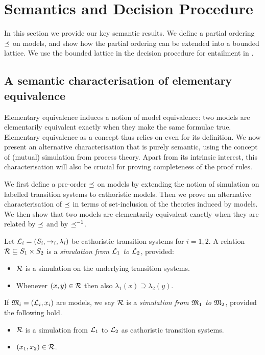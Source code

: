 \section{Semantics and Decision Procedure}\label{elAndBangCore}

In this section we provide our key semantic results.  We define a
partial ordering $\preceq$ on models, and show how the partial
ordering can be extended into a bounded lattice.  We use the bounded
lattice in the  decision procedure for entailment in \cathoristic.

\subsection{A semantic characterisation of elementary equivalence}\label{elementaryEquivalence}

Elementary equivalence induces a notion of model equivalence: two
models are elementarily equivalent exactly when they make the same
formulae true. Elementary equivalence as a concept thus relies on
\cathoristic{} even for its definition. We now present an alternative
characterisation that is purely semantic, using the concept of
(mutual) simulation from process theory. Apart from its intrinsic
interest, this characterisation will also be crucial for proving
completeness of the proof rules.

We first define a pre-order $\preceq$ on models by extending the
notion of simulation on labelled transition systems to cathoristic
models. Then we prove an alternative characterisation of $\preceq$
in terms of set-inclusion of the theories induced by models. We then
show that two models are elementarily equivalent exactly when they are
related by $\preceq$ and by $\preceq^{-1}$.

\begin{definition}
Let $\mathcal{L}_i = (S_i, \rightarrow_i, \lambda_i)$ be cathoristic transition
systems for $i = 1, 2$.  A relation $\mathcal{R} \subseteq S_1 \times S_2$ is
a \emph{simulation from $\mathcal{L}_1$ to $\mathcal{L}_2$}, provided:
\begin{itemize} 

\item $\mathcal{R}$ is a simulation on the underlying transition systems. 

\item Whenever $(x, y) \in \mathcal{R}$ then also $\lambda_1(x) \supseteq
  \lambda_2(y)$.

\end{itemize}

\NI If $\frak{M}_i = (\mathcal{L}_i, x_i)$ are models, we say $\mathcal{R}$ is a
\emph{simulation from $\frak{M}_1$ to $\frak{M}_2$}, provided the following hold.

\begin{itemize}

\item $\mathcal{R}$ is a simulation from $\mathcal{L}_1$ to $\mathcal{L}_2$ as cathoristic transition systems.

\item  $(x_1, x_2) \in \mathcal{R}$. 

\end{itemize}

\end{definition}

